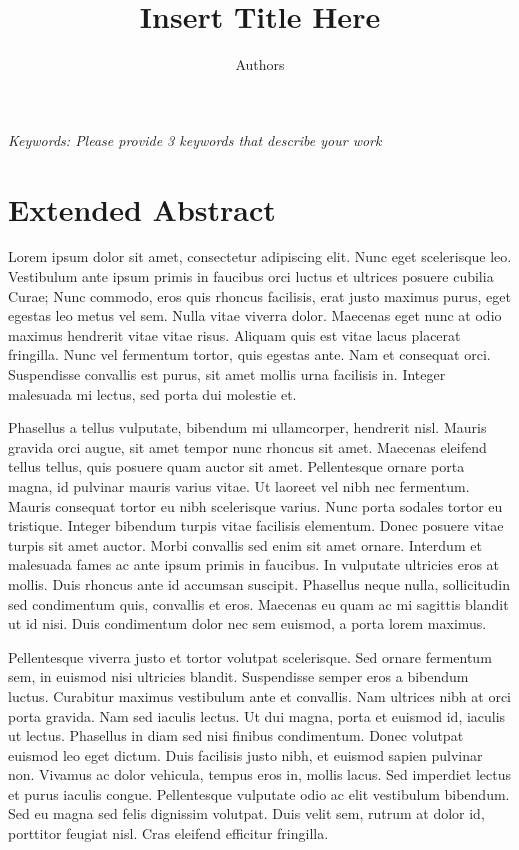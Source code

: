 \documentclass[a4paper,12pt]{article}
\title{\vspace{-2.5em}Insert Title Here}
\author[]{Authors}
\date{}
\begin{document}
\vspace{-2em}
\maketitle
\thispagestyle{fancy}

\vspace{-2em}
\noindent\textit{Keywords: Please provide 3 keywords that describe your work}

\section*{Extended Abstract}

Lorem ipsum dolor sit amet, consectetur adipiscing elit. Nunc eget scelerisque leo. Vestibulum ante ipsum primis in faucibus orci luctus et ultrices posuere cubilia Curae; Nunc commodo, eros quis rhoncus facilisis, erat justo maximus purus, eget egestas leo metus vel sem. Nulla vitae viverra dolor. Maecenas eget nunc at odio maximus hendrerit vitae vitae risus. Aliquam quis est vitae lacus placerat fringilla. Nunc vel fermentum tortor, quis egestas ante. Nam et consequat orci. Suspendisse convallis est purus, sit amet mollis urna facilisis in. Integer malesuada mi lectus, sed porta dui molestie et. 

Phasellus a tellus vulputate, bibendum mi ullamcorper, hendrerit nisl. Mauris gravida orci augue, sit amet tempor nunc rhoncus sit amet. Maecenas eleifend tellus tellus, quis posuere quam auctor sit amet. Pellentesque ornare porta magna, id pulvinar mauris varius vitae. Ut laoreet vel nibh nec fermentum. Mauris consequat tortor eu nibh scelerisque varius. Nunc porta sodales tortor eu tristique. Integer bibendum turpis vitae facilisis elementum. Donec posuere vitae turpis sit amet auctor. Morbi convallis sed enim sit amet ornare. Interdum et malesuada fames ac ante ipsum primis in faucibus. In vulputate ultricies eros at mollis. Duis rhoncus ante id accumsan suscipit. Phasellus neque nulla, sollicitudin sed condimentum quis, convallis et eros. Maecenas eu quam ac mi sagittis blandit ut id nisi. Duis condimentum dolor nec sem euismod, a porta lorem maximus. 

Pellentesque viverra justo et tortor volutpat scelerisque. Sed ornare fermentum sem, in euismod nisi ultricies blandit. Suspendisse semper eros a bibendum luctus. Curabitur maximus vestibulum ante et convallis. Nam ultrices nibh at orci porta gravida. Nam sed iaculis lectus. Ut dui magna, porta et euismod id, iaculis ut lectus. Phasellus in diam sed nisi finibus condimentum. Donec volutpat euismod leo eget dictum. Duis facilisis justo nibh, et euismod sapien pulvinar non. Vivamus ac dolor vehicula, tempus eros in, mollis lacus. Sed imperdiet lectus et purus iaculis congue. Pellentesque vulputate odio ac elit vestibulum bibendum. Sed eu magna sed felis dignissim volutpat. Duis velit sem, rutrum at dolor id, porttitor feugiat nisl. Cras eleifend efficitur fringilla. 
\end{document}
